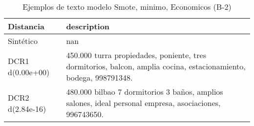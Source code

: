 \begin{table}[H]
\centering
\fontsize{10}{14}\selectfont
\caption{Ejemplos de texto modelo Smote, minimo, Economicos (B-2)}
\label{table-example-economicos-b-2-smote-enc-min-text}
\begin{tabular}{|l|m{35em}|}
\hline
\rowcolor[gray]{0.8}
Distancia & description \\
\hline Sintético & nan \\
\hline DCR1 d(0.00e+00) & 450.000 turra propiedades, poniente, tres dormitorios, balcon, amplia cocina, estacionamiento, bodega, 998791348. \\
\hline DCR2 d(2.84e-16) & 480.000 bilbao 7 dormitorios 3 ba\~nos, amplios salones, ideal personal empresa, asociaciones, 996743650. \\
\hline
\end{tabular}
\end{table}
